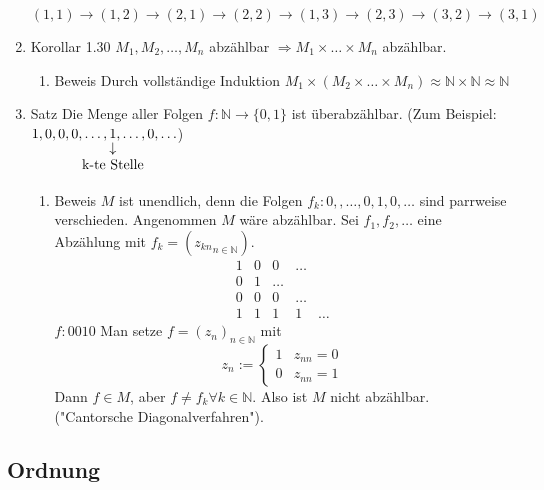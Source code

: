 \documentclass[11pt]{article}
\DeclareMathOperator{\Forall}{\forall}%
\begin{document}
\begin{enumerate}
\[(1,1) \to (1,2) \to (2,1) \to (2,2) \to (1,3) \to (2,3) \to (3,2) \to (3,1)\]
\item Korollar 1.30
\label{sec-2-5-1-4}
$M_1,M_2,\ldots,M_n$ abzählbar $\Rightarrow M_1 \times \ldots \times M_n$ abzählbar.
\begin{enumerate}
\item Beweis
\label{sec-2-5-1-4-1}
Durch vollständige Induktion $M_1\times(M_2\times\ldots \times M_n)\approx \mathbb{N}\times\mathbb{N}\approx\mathbb{N}$
\end{enumerate}
\item Satz
\label{sec-2-5-1-5}
Die Menge aller Folgen $f:\mathbb{N}\to\{0,1\}$ ist überabzählbar. (Zum Beispiel: $1,0,0,0,\ldots, \underarrow[1]{\text{k-te Stelle}},\ldots,0,\ldots$)
\begin{enumerate}
\item Beweis
\label{sec-2-5-1-5-1}
$M$ ist unendlich, denn die Folgen $f_k:0,,\ldots,0,1,0,\ldots$ sind parrweise verschieden. Angenommen $M$ wäre abzählbar. Sei $f_1,f_2, \ldots$ eine Abzählung mit $f_k = ({z_{kn}}_{n\in \mathbb{N}})$.
\[\begin{matrix}1 & 0 & 0 & \ldots \\ 0 & 1 & \ldots \\ 0 & 0 & 0 & \ldots \\ 1 & 1 & 1 & 1 & \ldots \end{matrix}\]
$f:0 0 1 0$ Man setze $f=(z_n)_{n\in\mathbb{N}}$ mit \[z_n := \begin{cases} 1 & z_{nn} = 0 \\ 0 & z_{nn} = 1\end{cases}\]
Dann $f\in M$, aber $f\neq f_k \Forall k\in\mathbb{N}$. Also ist $M$ nicht abzählbar. ("Cantorsche Diagonalverfahren").
\end{enumerate}
\end{enumerate}
\subsection{Ordnung}
\label{sec-2-6}
\end{document}
